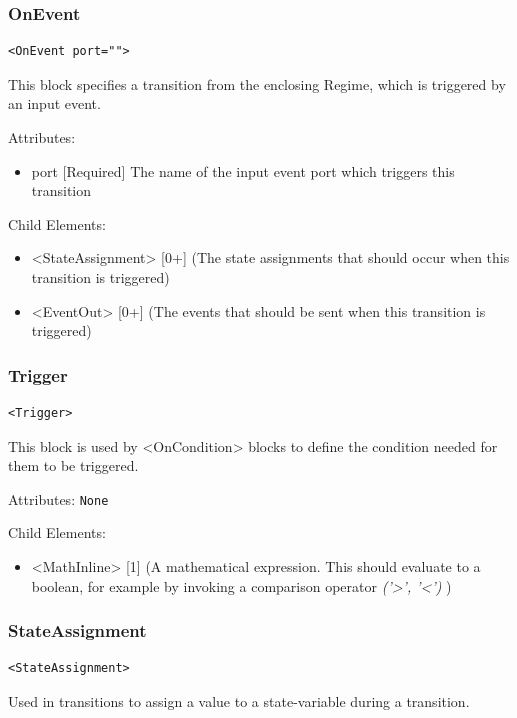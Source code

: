 \documentclass{article}
\begin{document}
\subsubsection{OnEvent}
%
\begin{lstlisting}
<OnEvent port="">
\end{lstlisting}

This block specifies a transition from the enclosing Regime, which is triggered
by an input event.

Attributes:
%
\begin{itemize}
\item port {[}Required{]} The name of the input event port which triggers this
transition
\end{itemize}

Child Elements:
%
\begin{itemize}
\item <StateAssignment> {[}0+{]} (The state assignments that should occur when this
transition is triggered)
\item <EventOut> {[}0+{]} (The events that should be sent when this transition is triggered)
\end{itemize}

\subsubsection{Trigger}
%
\begin{lstlisting}
<Trigger>
\end{lstlisting}

This block is used by <OnCondition> blocks to define the condition needed for
them to be triggered.

Attributes: \texttt{None}

Child Elements:
%
\begin{itemize}
\item <MathInline> {[}1{]} (A mathematical expression. This should evaluate to a
boolean, for example by invoking a comparison operator  \textsl{('>', '<')} )
\end{itemize}

\subsubsection{StateAssignment}
%
\begin{lstlisting}
<StateAssignment>
\end{lstlisting}

Used in transitions to assign a value to a state-variable during a transition.
\end{document}
